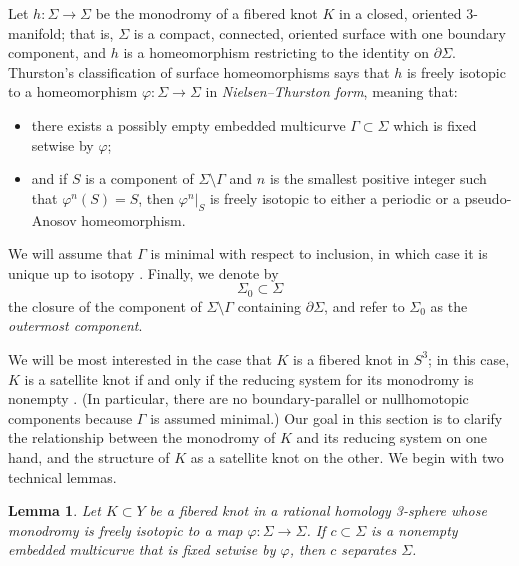 \documentclass[11pt]{amsart}
\newtheorem {lemma}[theorem]{Lemma}
\numberwithin{equation}{section}
\numberwithin{theorem}{section}
\theoremstyle{definition}
\renewcommand{\phi}{\varphi}
\begin{document}
Let $h: \Sigma \to \Sigma$ be the monodromy of a fibered knot $K$ in a closed, oriented 3-manifold; that is, $\Sigma$ is a compact, connected, oriented surface with one boundary component, and $h$ is a homeomorphism restricting to the identity on $\partial \Sigma$. 
Thurston's classification of surface homeomorphisms \cite{thurston-surfaces} says that $h$ is freely isotopic to a homeomorphism $\phi:\Sigma\to \Sigma$ in \emph{Nielsen--Thurston form}, meaning that:
\begin{itemize}
\item there exists a possibly empty embedded multicurve $\Gamma \subset \Sigma$ which is fixed setwise by $\varphi$;
\item and if $S$ is a component of $\Sigma \setminus \Gamma$ and $n$ is the smallest positive integer such that $\varphi^n(S)=S$, then $\phi^n|_S$ is freely isotopic to either a periodic or a pseudo-Anosov homeomorphism.
\end{itemize}
We will assume that $\Gamma$ is minimal with respect to inclusion, in which case it is unique up to isotopy \cite[Theorem C]{blm}.  Finally, we denote by \[\Sigma_0 \subset \Sigma\] the closure of the component of $\Sigma \setminus \Gamma$ containing  $\partial\Sigma$, and refer to $\Sigma_0$ as the \emph{outermost component}.

We will be most interested in the case that $K$ is a fibered knot in $S^3$; in this case, $K$ is a satellite knot if and only if the reducing system for its monodromy is nonempty \cite{thurston-fiber}.  (In particular, there are no boundary-parallel or nullhomotopic components because $\Gamma$ is assumed minimal.)
Our goal in this section is to clarify the relationship between the monodromy of $K$ and its reducing system on one hand, and the structure of $K$ as a satellite knot on the other. We begin with two technical lemmas.

\begin{lemma} \label{lem:separating-multicurve}
Let $K \subset Y$ be a fibered knot in a rational homology 3-sphere whose monodromy is freely isotopic to a map $\phi: \Sigma \to \Sigma$.  If $c \subset \Sigma$ is a nonempty embedded multicurve that is fixed setwise by $\phi$, then $c$ separates $\Sigma$.
\end{lemma}
\end{document}
